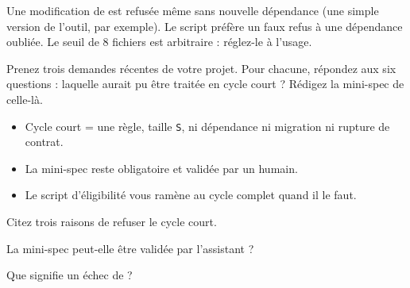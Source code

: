 \begin{piege}
Une modification de  est refusée même sans nouvelle dépendance (une simple version de l'outil, par
exemple). Le script préfère un faux refus à une dépendance oubliée. Le seuil de 8 fichiers est arbitraire : réglez-le à l'usage.
\end{piege}

\begin{vousjouez}
Prenez trois demandes récentes de votre projet. Pour chacune, répondez aux six questions : laquelle aurait pu être traitée en
cycle court ? Rédigez la mini-spec de celle-là.
\end{vousjouez}

\begin{retenir}[À retenir]
\begin{itemize}
  \item Cycle court = une règle, taille \texttt{S}, ni dépendance ni migration ni rupture de contrat.
  \item La mini-spec reste obligatoire et validée par un humain.
  \item Le script d'éligibilité vous ramène au cycle complet quand il le faut.
\end{itemize}
\end{retenir}

\begin{acquis}
  \item Citez trois raisons de refuser le cycle court.
  \item La mini-spec peut-elle être validée par l'assistant ?
  \item Que signifie un échec de  ?
\end{acquis}
